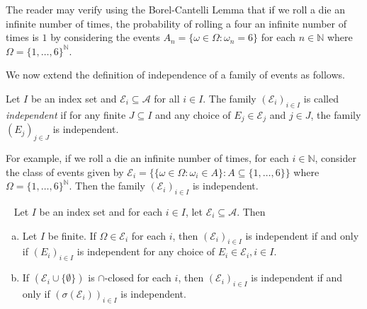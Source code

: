 The reader may verify using the Borel-Cantelli Lemma that if we roll a die an infinite number of times, the probability of rolling a four an infinite number of times is $1$ by considering the events $A_n = \{\omega\in\Omega:\omega_n=6\}$ for each $n\in\mathbb{N}$ where $\Omega=\{1,\ldots,6\}^\mathbb{N}$.

\vspace{2mm}
We now extend the definition of independence of a family of events as follows.

\begin{definition}
\label{independence of classes of events}
    Let $I$ be an index set and $\mathcal{E}_i\subseteq\mathcal{A}$ for all $i\in I$. The family $(\mathcal{E}_i)_{i\in I}$ is called \textit{independent} if for any finite $J\subseteq I$ and any choice of $E_j\in\mathcal{E}_j$ and $j\in J$, the family $(E_j)_{j\in J}$ is independent.
\end{definition}

For example, if we roll a die an infinite number of times, for each $i\in\mathbb{N}$, consider the class of events given by $\mathcal{E}_i=\{\{\omega\in\Omega:\omega_i\in A\}:A\subseteq\{1,\ldots,6\}\}$
where $\Omega=\{1,\ldots,6\}^\mathbb{N}$. Then the family $(\mathcal{E}_i)_{i\in I}$ is independent.

\begin{theorem}
~
    Let $I$ be an index set and for each $i\in I$, let $\mathcal{E}_i\subseteq \mathcal{A}$. Then
    \begin{enumerate}[(a)]
        \item Let $I$ be finite. If $\Omega\in\mathcal{E}_i$ for each $i$, then $(\mathcal{E}_i)_{i\in I}$ is independent if and only if $(E_i)_{i\in I}$ is independent for any choice of $E_i\in\mathcal{E}_i,i\in I$.
        
        \item If $(\mathcal{E}_i\cup\{\emptyset\})$ is $\cap$-closed for each $i$, then $(\mathcal{E}_i)_{i\in I}$ is independent if and only if $(\sigma(\mathcal{E}_i))_{i\in I}$ is independent.
        
    \end{enumerate}
\end{theorem}

